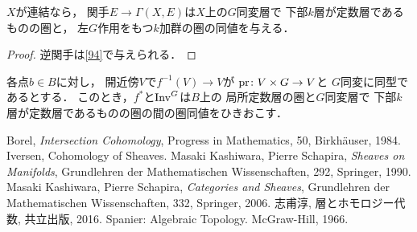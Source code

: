 \begin{LMM}\(X\)が連結なら，
    関手\(E\to \Gamma(X,E)\)は\(X\)上の\(G\)同変層で
    下部\(k\)層が定数層であるものの圏と，
    左\(G\)作用をもつ\(k\)加群の圏の同値を与える．
\end{LMM}

\begin{proof}
    逆関手は\eqref{94}で与えられる．
\end{proof}

\begin{LMM}
    各点\(b\in B\)に対し，
    開近傍\(V\)で\(f^{-1}(V)\to V\)が
    \(\mathop{\mathrm{pr}}\nolimits\colon V\times G\to V\)と
    \(G\)同変に同型であるとする．
    このとき，\(f^\ast\)と\(\mathop{\mathrm{Inv}}\nolimits^G\)は\(B\)上の
    局所定数層の圏と\(G\)同変層で
    下部\(k\)層が定数層であるものの圏の間の圏同値をひきおこす．
\end{LMM}




\begin{thebibliography}{20} 
     Borel, 
    \textit{Intersection Cohomology}, 
    Progress in Mathematics, 50, Birkh\"auser, 1984.
     Iversen, Cohomology of Sheaves.
 Masaki Kashiwara, Pierre Schapira, 
    \textit{Sheaves on Manifolds}, 
    Grundlehren der Mathematischen Wissenschaften, 292, Springer, 1990.
 Masaki Kashiwara, Pierre Schapira, 
    \textit{Categories and Sheaves}, 
    Grundlehren der Mathematischen Wissenschaften, 332, Springer, 2006.
 志甫淳, 層とホモロジー代数, 共立出版, 2016.
 Spanier: Algebraic Topology. McGraw-Hill, 1966.
\end{thebibliography}




